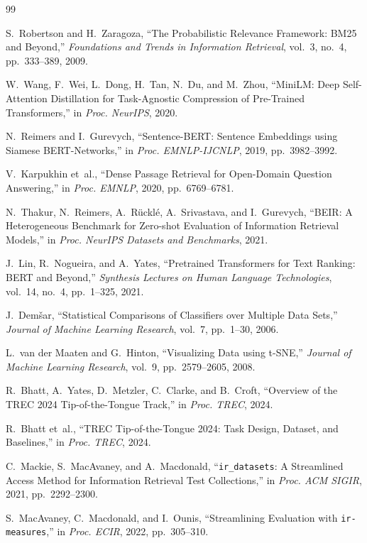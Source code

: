 \documentclass[conference]{IEEEtran}
\begin{document}
\begin{thebibliography}{99}

S.~Robertson and H.~Zaragoza,
``The Probabilistic Relevance Framework: BM25 and Beyond,''
\textit{Foundations and Trends in Information Retrieval},
vol.~3, no.~4, pp.~333--389, 2009.

W.~Wang, F.~Wei, L.~Dong, H.~Tan, N.~Du, and M.~Zhou,
``MiniLM: Deep Self-Attention Distillation for Task-Agnostic Compression
of Pre-Trained Transformers,''
in \textit{Proc. NeurIPS}, 2020.

N.~Reimers and I.~Gurevych,
``Sentence-BERT: Sentence Embeddings using Siamese BERT-Networks,''
in \textit{Proc. EMNLP-IJCNLP}, 2019, pp.~3982--3992.

V.~Karpukhin et~al.,
``Dense Passage Retrieval for Open-Domain Question Answering,''
in \textit{Proc. EMNLP}, 2020, pp.~6769--6781.

N.~Thakur, N.~Reimers, A.~R{\"u}ckl{\'e}, A.~Srivastava, and I.~Gurevych,
``BEIR: A Heterogeneous Benchmark for Zero-shot Evaluation of
Information Retrieval Models,''
in \textit{Proc. NeurIPS Datasets and Benchmarks}, 2021.

J.~Lin, R.~Nogueira, and A.~Yates,
``Pretrained Transformers for Text Ranking: BERT and Beyond,''
\textit{Synthesis Lectures on Human Language Technologies},
vol.~14, no.~4, pp.~1--325, 2021.

J.~Dem{\v{s}}ar,
``Statistical Comparisons of Classifiers over Multiple Data Sets,''
\textit{Journal of Machine Learning Research},
vol.~7, pp.~1--30, 2006.

L.~van der Maaten and G.~Hinton,
``Visualizing Data using t-SNE,''
\textit{Journal of Machine Learning Research},
vol.~9, pp.~2579--2605, 2008.

R.~Bhatt, A.~Yates, D.~Metzler, C.~Clarke, and B.~Croft,
``Overview of the TREC 2024 Tip-of-the-Tongue Track,''
in \textit{Proc. TREC}, 2024.

R.~Bhatt et~al.,
``TREC Tip-of-the-Tongue 2024: Task Design, Dataset, and Baselines,''
in \textit{Proc. TREC}, 2024.

C.~Mackie, S.~MacAvaney, and A.~Macdonald,
``\texttt{ir\_datasets}: A Streamlined Access Method for Information
Retrieval Test Collections,''
in \textit{Proc. ACM SIGIR}, 2021, pp.~2292--2300.

S.~MacAvaney, C.~Macdonald, and I.~Ounis,
``Streamlining Evaluation with \texttt{ir-measures},''
in \textit{Proc. ECIR}, 2022, pp.~305--310.

\end{thebibliography}
\end{document}
